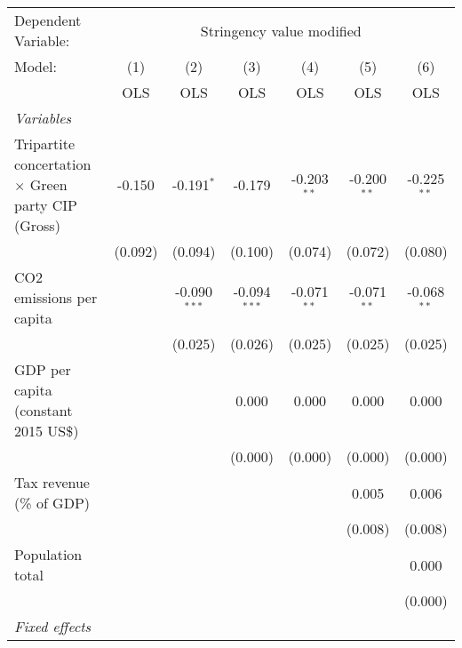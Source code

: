 
\begingroup
\centering
\begin{tabular}{lcccccc}
   \toprule
   Dependent Variable: & \multicolumn{6}{c}{Stringency value modified}\\
   Model:                                                    & (1)     & (2)            & (3)            & (4)           & (5)           & (6)\\  
                                                             &  OLS    & OLS            & OLS            & OLS           & OLS           & OLS\\  
   \midrule
   \emph{Variables}\\
   Tripartite concertation $\times$ Green party CIP (Gross)  & -0.150  & -0.191$^{*}$   & -0.179         & -0.203$^{**}$ & -0.200$^{**}$ & -0.225$^{**}$\\   
                                                             & (0.092) & (0.094)        & (0.100)        & (0.074)       & (0.072)       & (0.080)\\   
   CO2 emissions per capita                                  &         & -0.090$^{***}$ & -0.094$^{***}$ & -0.071$^{**}$ & -0.071$^{**}$ & -0.068$^{**}$\\   
                                                             &         & (0.025)        & (0.026)        & (0.025)       & (0.025)       & (0.025)\\   
   GDP per capita (constant 2015 US\$)                       &         &                & 0.000          & 0.000         & 0.000         & 0.000\\   
                                                             &         &                & (0.000)        & (0.000)       & (0.000)       & (0.000)\\   
   Tax revenue (\% of GDP)                                   &         &                &                &               & 0.005         & 0.006\\   
                                                             &         &                &                &               & (0.008)       & (0.008)\\   
   Population total                                          &         &                &                &               &               & 0.000\\   
                                                             &         &                &                &               &               & (0.000)\\   
   \emph{Fixed effects}\\

\end{tabular}

